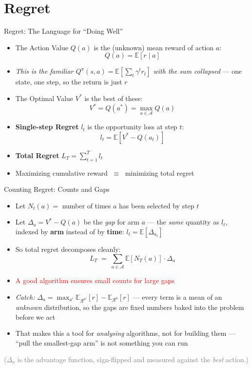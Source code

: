 \section{Regret}
\begin{frame}{Regret: The Language for ``Doing Well''}
\begin{itemize}
    \item The Action Value $Q(a)$ is the (unknown) mean reward of action $a$:
    \[
        Q(a) = \mathbb{E}[r \mid a]
    \]
    \item \emph{This is the familiar $Q^\pi(s,a) = \mathbb{E}[\sum_t \gamma^t r_t]$ with the sum collapsed} --- one state, one step, so the return is just $r$
    \item The Optimal Value $V^*$ is the best of these:
    \[
        V^* = Q(a^*) = \max_{a \in \mathcal{A}} Q(a)
    \]
    \item \textbf{Single-step Regret} $l_t$ is the opportunity loss at step $t$:
    \[
        l_t = \mathbb{E}[V^* - Q(a_t)]
    \]
    \item \textbf{Total Regret} $L_T = \sum_{t=1}^{T} l_t$
    \item Maximizing cumulative reward $\;\equiv\;$ minimizing total regret
\end{itemize}
\end{frame}

\begin{frame}{Counting Regret: Counts and Gaps}
\begin{itemize}
    \setlength{\itemsep}{0.35em}
    \item Let $N_t(a) = $ number of times $a$ has been selected by step $t$
    \item Let $\Delta_a = V^* - Q(a)$ be the \emph{gap} for arm $a$ --- the \emph{same} quantity as $l_t$, indexed by \textbf{arm} instead of by \textbf{time}: $l_t = \mathbb{E}[\Delta_{a_t}]$
    \item So total regret decomposes cleanly:
    \[
        L_T \;=\; \sum_{a \in \mathcal{A}} \mathbb{E}[N_T(a)] \cdot \Delta_a
    \]
    \item \textcolor{red}{A good algorithm ensures small counts for large gaps}
    \item \emph{Catch:} $\Delta_a = \max_{a'} \mathbb{E}_{\mathcal{R}^{a'}}[r] - \mathbb{E}_{\mathcal{R}^{a}}[r]$ --- every term is a mean of an \emph{unknown} distribution, so the gaps are fixed numbers baked into the problem before we act
    \item That makes this a tool for \emph{analysing} algorithms, not for building them --- ``pull the smallest-gap arm'' is not something you can run
\end{itemize}
\centering\small\textcolor{gray}{($\Delta_a$ is the advantage function, sign-flipped and measured against the \emph{best} action.)}
\end{frame}

